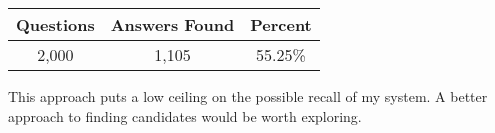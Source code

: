 \documentclass[a4paper, 11pt]{article} %
\begin{document}
\begin{table}[H]
\centering
{\renewcommand{\arraystretch}{1.2}%
\begin{tabular}{| c | c | c |}
\hline
Questions & Answers Found & Percent\\
\hline
2,000 & 1,105 & 55.25\%  \\ \hline
\end{tabular}}
\end{table}

This approach puts a low ceiling on the possible recall of my system. A better approach to finding candidates would be worth exploring.
\end{document}
